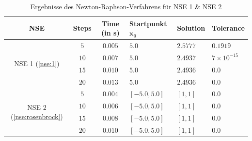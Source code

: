 \documentclass{article}
\theoremstyle{newline}
\begin{document}
\begin{onehalfspace}
\begin{table}[h]
	\centering
	
	\begin{tabular}{c||c|c|>{\centering\arraybackslash}p{2cm}|>{\centering\arraybackslash}p{3cm}|>{\centering\arraybackslash}p{2.5cm}}
		\textbf{NSE} & \textbf{Steps} & \textbf{Time} (in s) & \textbf{Startpunkt} $\mathbf{x_0}$ & \textbf{Solution} & \textbf{Tolerance}  \\
		\hline
		\multirow{4}{*}{NSE 1 (\ref{nse:1})} & $5$ & $0.005$ & $5.0$ & $2.5777$ & $0.1919$\\
		& $10$ & $0.007$ & $5.0$ & $2.4937$ & $7 \times 10^{-15}$\\
		& $15$ & $0.010$ & $5.0$ & $2.4936$ & $0.0$\\
		& $20$ & $0.013$ & $5.0$ & $2.4936$ & $0.0$\\
		\hline
		\multirow{4}{*}{NSE 2 (\ref{nse:rosenbrock})} & $5$ & $0.004$ & $[-5.0, 5.0]$ & $[1, 1]$ & $0.0$\\
		 & $10$ & $0.006$ & $[-5.0, 5.0]$ & $[1, 1]$ & $0.0$\\
		 & $15$ & $0.008$ & $[-5.0, 5.0]$ & $[1, 1]$ & $0.0$\\
		 & $20$ & $0.010$ & $[-5.0, 5.0]$ & $[1, 1]$ & $0.0$\\
	\end{tabular}
	\caption{Ergebnisse des Newton-Raphson-Verfahrens für NSE 1 \& NSE 2}
	\label{tab:Ergebnisse-Newton}
\end{table}


\end{onehalfspace}
\end{document}
